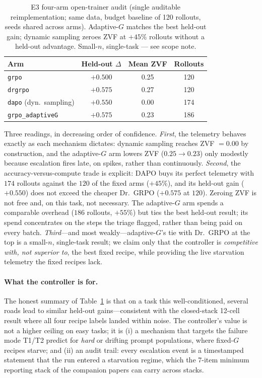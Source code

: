 \begin{table}[t]
\centering
\caption{E3 four-arm open-trainer audit (single auditable reimplementation;
same data, budget baseline of 120 rollouts, seeds shared across arms).
Adaptive-$G$ matches the best held-out gain; dynamic sampling zeroes ZVF at
$+45\%$ rollouts without a held-out advantage. Small-$n$, single-task ---
see scope note.}
\label{tab:p7-e3}
\begin{tabular}{lccc}
\toprule
Arm & Held-out $\Delta$ & Mean ZVF & Rollouts \\
\midrule
\texttt{grpo}            & $+0.500$ & 0.25 & 120 \\
\texttt{drgrpo}          & $+0.575$ & 0.27 & 120 \\
\texttt{dapo} (dyn.\ sampling) & $+0.550$ & 0.00 & 174 \\
\texttt{grpo\_adaptiveG} & $+0.575$ & 0.23 & 186 \\
\bottomrule
\end{tabular}
\end{table}

Three readings, in decreasing order of confidence. \emph{First}, the
telemetry behaves exactly as each mechanism dictates: dynamic sampling
reaches ZVF $= 0.00$ by construction, and the adaptive-$G$ arm lowers ZVF
($0.25 \to 0.23$) only modestly because escalation fires late, on spikes,
rather than continuously. \emph{Second}, the accuracy-versus-compute trade
is explicit: DAPO buys its perfect telemetry with $174$ rollouts against the
$120$ of the fixed arms ($+45\%$), and its held-out gain ($+0.550$) does not
exceed the cheaper Dr.~GRPO ($+0.575$ at $120$). Zeroing ZVF is not free
and, on this task, not necessary. The adaptive-$G$ arm spends a comparable
overhead ($186$ rollouts, $+55\%$) but ties the best held-out result; its
spend concentrates on the steps the triage flagged, rather than being paid
on every batch. \emph{Third}---and most weakly---adaptive-$G$'s tie with
Dr.~GRPO at the top is a small-$n$, single-task result; we claim only that
the controller is \emph{competitive with, not superior to}, the best fixed
recipe, while providing the live starvation telemetry the fixed recipes
lack.

\paragraph{What the controller is for.} The honest summary of
Table~\ref{tab:p7-e3} is that on a task this well-conditioned, several roads
lead to similar held-out gains---consistent with the closed-stack 12-cell
result where all four recipe labels landed within noise. The controller's
value is not a higher ceiling on easy tasks; it is (i) a mechanism that
targets the failure mode T1/T2 predict for \emph{hard} or drifting prompt
populations, where fixed-$G$ recipes starve; and (ii) an audit trail: every
escalation event is a timestamped statement that the run entered a
starvation regime, which the 7-item minimum reporting stack of the
companion papers can carry across stacks.


